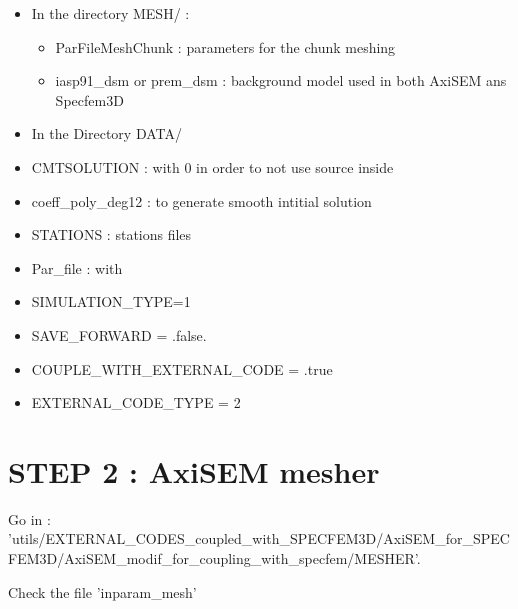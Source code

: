 \documentclass[11pt]{article}
\begin{document}
\begin{itemize}

\item[\textbullet] In the directory MESH/ :

\begin{itemize}

\item[\textbullet] ParFileMeshChunk  : parameters for the chunk meshing

\item[\textbullet] iasp91\_dsm or prem\_dsm : background model used in both AxiSEM ans Specfem3D

\end{itemize}


\item[\textbullet] In the Directory DATA/

\item[\textbullet] CMTSOLUTION  : with 0 in order to not use source inside

\item[\textbullet] coeff\_poly\_deg12 : to generate smooth intitial solution

\item[\textbullet] STATIONS  : stations files 

\item[\textbullet] Par\_file : with

\item[\textbullet] SIMULATION\_TYPE=1 

\item[\textbullet] SAVE\_FORWARD = .false. 

\item[\textbullet] COUPLE\_WITH\_EXTERNAL\_CODE = .true 

\item[\textbullet] EXTERNAL\_CODE\_TYPE    = 2 

\end{itemize}


\section{STEP 2 : AxiSEM mesher}

\noindent Go in  : {\scriptsize  'utils/EXTERNAL\_CODES\_coupled\_with\_SPECFEM3D/AxiSEM\_for\_SPECFEM3D/AxiSEM\_modif\_for\_coupling\_with\_specfem/MESHER'}.

\medskip

\noindent Check the file 'inparam\_mesh'
\end{document}
